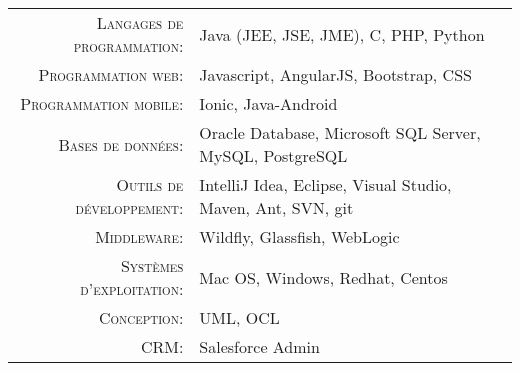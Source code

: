 %
%
%

\renewcommand{\arraystretch}{1.1}

	\begin{tabular}{>{}r>{}p{13cm}}
		\textsc{Langages de programmation:}  		&   Java (JEE, JSE, JME), C, PHP, Python\\
		\textsc{Programmation web:}               	&   Javascript, AngularJS, Bootstrap, CSS\\
		\textsc{Programmation mobile:}               	&   Ionic, Java-Android\\
		\textsc{Bases de données:}                  &   Oracle Database, Microsoft SQL Server, MySQL, PostgreSQL \\
		\textsc{Outils de développement:}	  		&   IntelliJ Idea, Eclipse, Visual Studio, Maven, Ant, SVN, git\\
		\textsc{Middleware:}				        &   Wildfly, Glassfish, WebLogic\\
		\textsc{Systèmes d'exploitation:}	        &   Mac OS, Windows, Redhat, Centos\\
		\textsc{Conception:}				        &   UML, OCL\\
		\textsc{CRM:}				                &   Salesforce Admin\\
	\end{tabular}
